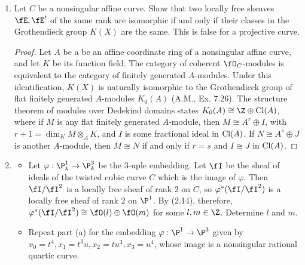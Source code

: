 \documentclass[a4paper]{article}
\begin{document}
\begin{enumerate} [label=\textbf{\arabic*.}, leftmargin=0em]


    \item[\textbf{16.}] Let $C$ be a nonsingular affine curve.
          Show that two locally free sheaves $\fE, \fE'$ of the same rank are isomorphic if and only if their classes in the Grothendieck group $K(X)$ are the same.
          This is false for a projective curve.

          \begin{proof}
              Let $A$ be a be an affine coordinate ring of a nonsingular affine curve, and let $K$ be its function field.
              The category of coherent $\fO_C$-modules is equivalent to the category of finitely generated $A$-modules.
              Under this identification, $K(X)$ is naturally isomorphic to the Grothendieck group of flat finitely generated $A$-modules $K_0(A)$ (A.M., Ex. 7.26).
              The structure theorem of modules over Dedekind domains states $K_0(A) \cong \Z \oplus \cl(A)$, where if $M$ is any flat finitely generated $A$-module, then $M \cong A^{r} \oplus I$, with $r + 1 = \dim_K M \otimes_A K$, and $I$ is some fractional ideal in $\operatorname{Cl}(A)$.
              If $N \cong A^{s} \oplus J$ is another $A$-module, then $M \cong N$ if and only if $r = s$ and $I \cong J$ in $\operatorname{Cl}(A)$.
          \end{proof}

    \item[\textbf{17.}] \begin{itemize}
              \item[(a)] Let $\varphi : \P_k^1 \to \P_k^3$ be the 3-uple embedding.
                    Let $\fI$ be the sheaf of ideals of the twisted cubic curve $C$ which is the image of $\varphi$.
                    Then $\fI / \fI^2$ is a locally free sheaf of rank 2 on $C$, so $\varphi^*(\fI / \fI^2)$ is a locally free sheaf of rank 2 on $\P^1$.
                    By (2.14), therefore, $\varphi^*(\fI/\fI^2) \cong \fO(l) \oplus \fO(m)$ for some $l, m \in \Z$.
                    Determine $l$ and $m$.
              \item[(b)] Repeat part (a) for the embedding $\varphi : \P^1 \to \P^3$ given by $x_0 = t^4, x_1 = t^3u, x_2 = tu^3, x_3 = u^4$, whose image is a nonsingular rational quartic curve.
          \end{itemize}


\end{enumerate}
\end{document}
